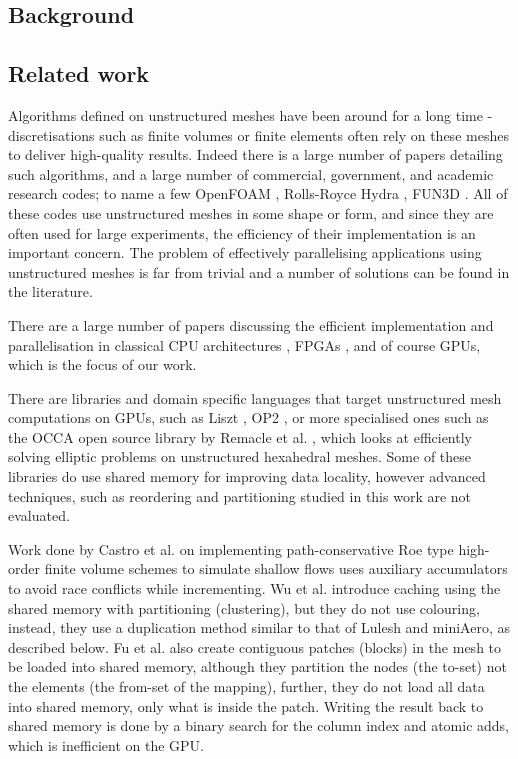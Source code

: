 \subsection{Background}\label{sec:background}


\subsection{Related work}\label{related-works}

Algorithms defined on unstructured meshes have been around for a long time -
discretisations such as finite volumes or finite elements often rely on these
meshes to deliver high-quality results. Indeed there is a large number of papers
detailing such algorithms, and a large number of commercial, government, and
academic research codes; to name a few OpenFOAM \cite{OpenFoamUserGuide},
Rolls-Royce Hydra \cite{moinier2002edge}, FUN3D \cite{biedron2017fun3d}. All of
these codes use unstructured meshes in some shape or form, and since they are
often used for large experiments, the efficiency of their implementation is  an
important concern. The problem of effectively parallelising applications using
unstructured meshes is far from trivial and a number of solutions can be found
in the literature.

There are a large number of papers discussing the efficient implementation and
parallelisation in classical CPU architectures
\cite{mavriplis2002parallel,jin1999openmp}, FPGAs
\cite{nagy2014accelerating,akamine2012reconfigurable}, and of course GPUs,
which is the focus of our work.

There are libraries and domain specific languages that target unstructured mesh
computations on GPUs, such as Liszt \cite{devito2011liszt}, OP2
\cite{giles2012op2}, or more specialised ones such as the OCCA\cite{libocca}
open source library by Remacle et al. \cite{remacle2016gpu}, which looks at
efficiently solving elliptic problems on unstructured hexahedral meshes. Some
of these libraries do use shared memory for improving data locality, however
advanced techniques, such as reordering and partitioning studied in this work
are not evaluated. 

Work done by Castro et al. \cite{shallow_water} on implementing
path-conservative Roe type high-order finite volume schemes to simulate shallow
flows uses auxiliary accumulators to avoid race conflicts while
incrementing. Wu et al. \cite{wu2013complexity} introduce caching using the
shared memory with partitioning (clustering), but they do not use colouring,
instead, they use a duplication method similar to that of Lulesh and miniAero,
as described below. Fu et al. \cite{fu2014architecting} also create contiguous
patches (blocks) in the mesh to be loaded into shared memory, although they
partition the nodes (the to-set) not the elements (the from-set of the
mapping), further, they do not load all data into shared memory, only what is
inside the patch. Writing the result back to shared memory is done by a binary
search for the column index and atomic adds, which is inefficient on the GPU. 

